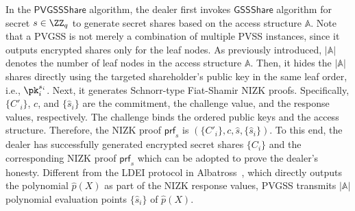 \documentclass[runningheads]{llncs}
\newcommand{\gssshare}{\mathsf{GSSShare}}
\newcommand{\pvgssShare}{\mathsf{PVGSSShare}}
\newcommand{\proofs}{\mathsf{prf}}
\begin{document}
In the $\pvgssShare$ algorithm, the dealer first invokes $\gssshare$ algorithm for secret $s\in\ZZ_q$ to generate secret shares based on the access structure $\mathbb{A}$. Note that a PVGSS is not merely a combination of multiple PVSS instances, since it outputs encrypted shares only for the leaf nodes. As previously introduced, \(|\mathbb{A}|\) denotes the number of leaf nodes in the access structure \(\mathbb{A}\). Then, it hides the $|\mathbb{A}|$ shares directly using the targeted shareholder's public key in the same leaf order, i.e., $\pk_i^{s_i}$. Next, it generates Schnorr-type Fiat-Shamir NIZK proofs. Specifically, $\{C'_i\}$, $c$, and $\{\hat{s}_i\}$ are the commitment, the challenge value, and the response values, respectively. The challenge binds the ordered public keys and the access structure. Therefore, the NIZK proof $\proofs_s$ is $(\{C'_i\}, c, \hat{s}, \{\hat{s}_i\})$.
To this end, the dealer has successfully generated encrypted secret shares $\{C_i\}$ and the corresponding NIZK proof $\proofs_s$ which can be adopted to prove the dealer's honesty.
Different from the LDEI protocol in Albatross~\cite{cascudo2020albatross}, which directly outputs the polynomial $\hat{p}(X)$ as part of the NIZK response values, PVGSS transmits $|\mathbb{A}|$ polynomial evaluation points $\{\hat{s}_i\}$ of $\hat{p}(X)$.
\end{document}
